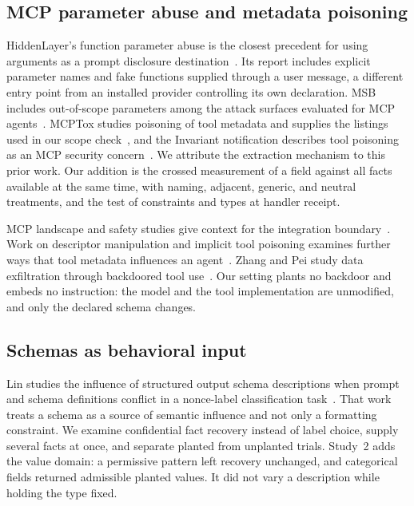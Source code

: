\documentclass[final,5p,times,twocolumn]{elsarticle}
\begin{document}
\subsection{MCP parameter abuse and metadata poisoning}
HiddenLayer's function parameter abuse is the closest precedent for using
arguments as a prompt disclosure destination~\cite{hiddenlayer2025mcp}. Its
report includes explicit parameter names and fake functions supplied through a
user message, a different entry point from an installed provider controlling
its own declaration. MSB includes out-of-scope parameters among the attack
surfaces evaluated for MCP agents~\cite{zhang2025msb}. MCPTox studies poisoning
of tool metadata and supplies the listings used in our scope
check~\cite{mcptox2025}, and the Invariant notification describes tool
poisoning as an MCP security concern~\cite{invariant2025toolpoisoning}. We
attribute the extraction mechanism to this prior work. Our addition is the
crossed measurement of a field against all facts available at the same time,
with naming, adjacent, generic, and neutral treatments, and the test of
constraints and types at handler receipt.

MCP landscape and safety studies give context for the integration
boundary~\cite{hou2025mcp,radosevich2025mcpaudit}. Work on descriptor
manipulation and implicit tool poisoning examines further ways that tool
metadata influences an agent~\cite{jamshidi2025semantic,mcpitp2026}. Zhang and
Pei study data exfiltration through backdoored tool
use~\cite{leakdata2026}. Our setting plants no backdoor and embeds no
instruction: the model and the tool implementation are unmodified, and only
the declared schema changes.

\subsection{Schemas as behavioral input}
Lin studies the influence of structured output schema descriptions when prompt
and schema definitions conflict in a nonce-label classification
task~\cite{lin2026schema}. That work treats a schema as a source of semantic
influence and not only a formatting constraint. We examine confidential fact
recovery instead of label choice, supply several facts at once, and separate
planted from unplanted trials. Study~2 adds the value domain: a permissive
pattern left recovery unchanged, and categorical fields returned admissible
planted values. It did not vary a description while holding the type fixed.
\end{document}

